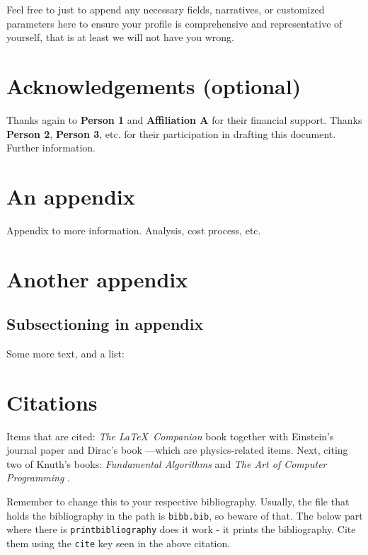 \documentclass[10pt,a4paper]{article}
\begin{document}
Feel free to just to append any necessary fields, narratives, or customized parameters here to ensure your profile is comprehensive and representative of yourself, that is at least we will not have you wrong. 



\clearpage

\section*{Acknowledgements (optional)}

Thanks again to \textbf{Person 1} and \textbf{Affiliation A} for their financial support. Thanks \textbf{Person 2}, \textbf{Person 3}, etc. for their participation in drafting this document. Further information. 


% 
% 

\appendix

\section{An appendix}

Appendix to more information. Analysis, cost process, etc. 

\section{Another appendix}

\subsection*{Subsectioning in appendix}

Some more text, and a list:

\blindenumerate



\section{Citations}
Items that are cited: \textit{The \LaTeX\ Companion} book \cite{latexcompanion} together with Einstein's journal paper \cite{einstein} and Dirac's book \cite{dirac}---which are physics-related items. Next, citing two of Knuth's books: \textit{Fundamental Algorithms} \cite{knuth-fa} and \textit{The Art of Computer Programming} \cite{knuthwebsite}.


Remember to change this to your respective bibliography. Usually, the file that holds the bibliography in the path is \texttt{bibb.bib}, so beware of that. The below part where there is \texttt{printbibliography} does it work - it prints the bibliography. Cite them using the \texttt{cite} key seen in the above citation. 

\medskip

\printbibliography %
\end{document}
